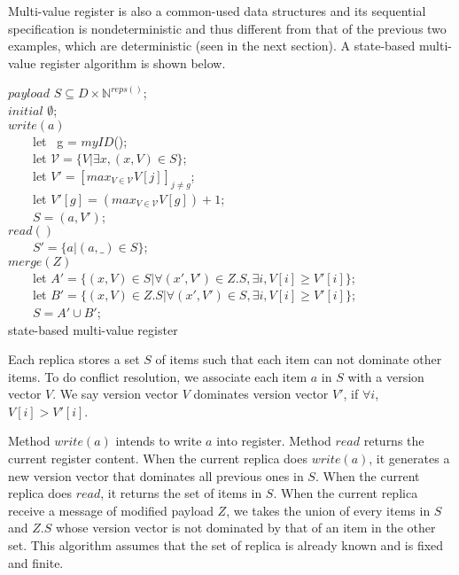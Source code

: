 {Multi-value register is also a common-used data structures and its sequential specification is nondeterministic and thus different from that of the previous two examples, which are deterministic (seen in the next section). A state-based multi-value register algorithm is shown below.


\renewcommand{\algorithmcfname}{CRDT Implementation}
\noindent
\noindent\begin{algorithm}[H]
$\mathit{payload}$ $S \subseteq D \times \mathbb{N}^{\mathit{reps}()}$; \\
$\mathit{initial}$ $\emptyset$; \\

$\mathit{write}(a)$ \\
\ \ \ \ let \ g = $\mathit{myID}$(); \\
\ \ \ \ let $\mathcal{V} = \{ V \vert \exists x, (x,V) \in S \}$; \\
\ \ \ \ let $V' = [ \mathit{max}_{V \in \mathcal{V}} V[j] ]_{j \neq g}$; \\
\ \ \ \ let $V'[g] = (\mathit{max}_{V \in \mathcal{V}} V[g]) + 1$; \\
\ \ \ \ $S = (a,V')$; \\

$\mathit{read}()$ \\
\ \ \ \ \KwRet $S' = \{ a \vert (a,\_) \in S \}$; \\

$\mathit{merge}(Z)$ \\
\ \ \ \ let $A' = \{ (x,V) \in S \vert \forall (x',V') \in Z.S, \exists i, V[i] \geq V'[i] \}$; \\
\ \ \ \ let $B' = \{ (x,V) \in Z.S \vert \forall (x',V') \in S, \exists i, V[i] \geq V'[i] \}$; \\
\ \ \ \ $S = A' \cup B'$; \\
\caption{state-based multi-value register}
\label{Method1}
\end{algorithm}

Each replica stores a set $S$ of items such that each item can not dominate other items. To do conflict resolution, we associate each item $a$ in $S$ with a version vector $V$. We say version vector $V$ dominates version vector $V'$, if $\forall i$, $V[i] > V'[i]$.

Method $\mathit{write}(a)$ intends to write $a$ into register. Method $\mathit{read}$ returns the current register content. When the current replica does $\mathit{write}(a)$, it generates a new version vector that dominates all previous ones in $S$. When the current replica does $\mathit{read}$, it returns the set of items in $S$. When the current replica receive a message of modified payload $Z$, we takes the union of every items in $S$ and $Z.S$ whose version vector is not dominated by that of an item in the other set. This algorithm assumes that the set of replica is already known and is fixed and finite.


}
